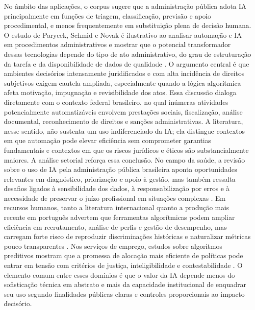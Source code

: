 \documentclass[12pt,a4paper]{article}
\begin{document}
No âmbito das aplicações, o corpus sugere que a administração pública adota IA principalmente em funções de triagem, classificação, previsão e apoio procedimental, e menos frequentemente em substituição plena de decisão humana. O estudo de Parycek, Schmid e Novak é ilustrativo ao analisar automação e IA em procedimentos administrativos e mostrar que o potencial transformador dessas tecnologias depende do tipo de ato administrativo, do grau de estruturação da tarefa e da disponibilidade de dados de qualidade \autocite{parycek2023artificial}. O argumento central é que ambientes decisórios intensamente juridificados e com alta incidência de direitos subjetivos exigem cautela ampliada, especialmente quando a lógica algorítmica afeta motivação, impugnação e revisibilidade dos atos. Essa discussão dialoga diretamente com o contexto federal brasileiro, no qual inúmeras atividades potencialmente automatizáveis envolvem prestações sociais, fiscalização, análise documental, reconhecimento de direitos e sanções administrativas. A literatura, nesse sentido, não sustenta um uso indiferenciado da IA; ela distingue contextos em que automação pode elevar eficiência sem comprometer garantias fundamentais e contextos em que os riscos jurídicos e éticos são substancialmente maiores.
A análise setorial reforça essa conclusão. No campo da saúde, a revisão sobre o uso de IA pela administração pública brasileira aponta oportunidades relevantes em diagnóstico, priorização e apoio à gestão, mas também ressalta desafios ligados à sensibilidade dos dados, à responsabilização por erros e à necessidade de preservar o juízo profissional em situações complexas \autocite{lemes2020o}. Em recursos humanos, tanto a literatura internacional quanto a produção mais recente em português advertem que ferramentas algorítmicas podem ampliar eficiência em recrutamento, análise de perfis e gestão de desempenho, mas carregam forte risco de reproduzir discriminações históricas e naturalizar métricas pouco transparentes \autocite{chilunjika2022artificial} \autocite{cho2023human} \autocite{barros2025inteligencia}. Nos serviços de emprego, estudos sobre algoritmos preditivos mostram que a promessa de alocação mais eficiente de políticas pode entrar em tensão com critérios de justiça, inteligibilidade e contestabilidade \autocite{krtner2021predictive}. O elemento comum entre esses domínios é que o valor da IA depende menos do sofisticação técnica em abstrato e mais da capacidade institucional de enquadrar seu uso segundo finalidades públicas claras e controles proporcionais ao impacto decisório.
\end{document}
